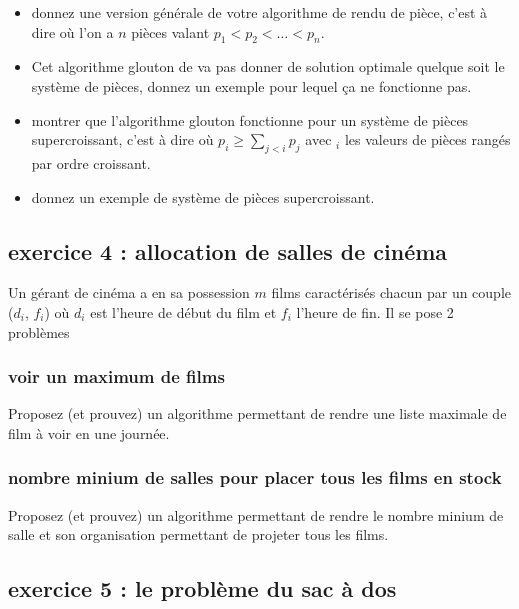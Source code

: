 \documentclass[
]{article}
\providecommand{\tightlist}{%
  \setlength{\itemsep}{0pt}\setlength{\parskip}{0pt}}
\begin{document}
\begin{itemize}
\tightlist
\item
  donnez une version générale de votre algorithme de rendu de pièce,
  c'est à dire où l'on a \(n\) pièces valant
  \(p_1 < p_2 < \dots < p_n\).
\item
  Cet algorithme glouton de va pas donner de solution optimale quelque
  soit le système de pièces, donnez un exemple pour lequel ça ne
  fonctionne pas.
\item
  montrer que l'algorithme glouton fonctionne pour un système de pièces
  supercroissant, c'est à dire où \(p_i \geq \sum_{j< i} p_j\) avec
  \(_i\) les valeurs de pièces rangés par ordre croissant.
\item
  donnez un exemple de système de pièces supercroissant.
\end{itemize}

\hypertarget{exercice-4-allocation-de-salles-de-cinuxe9ma}{%
\subsection{exercice 4 : allocation de salles de
cinéma}\label{exercice-4-allocation-de-salles-de-cinuxe9ma}}

Un gérant de cinéma a en sa possession \(m\) films caractérisés chacun
par un couple (\(d_i\), \(f_i\)) où \(d_i\) est l'heure de début du film
et \(f_i\) l'heure de fin. Il se pose 2 problèmes

\hypertarget{voir-un-maximum-de-films}{%
\subsubsection{voir un maximum de
films}\label{voir-un-maximum-de-films}}

Proposez (et prouvez) un algorithme permettant de rendre une liste
maximale de film à voir en une journée.

\hypertarget{nombre-minium-de-salles-pour-placer-tous-les-films-en-stock}{%
\subsubsection{nombre minium de salles pour placer tous les films en
stock}\label{nombre-minium-de-salles-pour-placer-tous-les-films-en-stock}}

Proposez (et prouvez) un algorithme permettant de rendre le nombre
minium de salle et son organisation permettant de projeter tous les
films.

\hypertarget{exercice-5-le-probluxe8me-du-sac-uxe0-dos}{%
\subsection{exercice 5 : le problème du sac à
dos}\label{exercice-5-le-probluxe8me-du-sac-uxe0-dos}}
\end{document}
